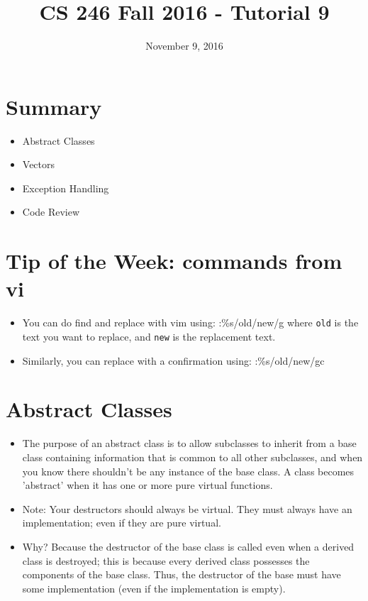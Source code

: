\documentclass{article}
\title{CS 246 Fall 2016 - Tutorial 9}
\author{}
\date{November 9, 2016}
\begin{document}
\maketitle

\section{Summary}
\begin{itemize}
\item Abstract Classes
\item Vectors
\item Exception Handling
\item Code Review
\end{itemize}

\section{Tip of the Week: commands from vi}

\begin{itemize}
    \item You can do find and replace with vim using: :\%s/old/new/g where \texttt{old} is the text you want to replace, and \texttt{new} is the replacement text.

    \item Similarly, you can replace with a confirmation using: :\%s/old/new/gc
\end{itemize}


\section{Abstract Classes}

\begin{itemize}

\item The purpose of an abstract class is to allow subclasses to inherit from a base class containing information that is common to all other subclasses, and when you know there shouldn't be any instance of the base class. A class becomes 'abstract' when it has one or more pure virtual functions.

\item Note: Your destructors should always be virtual. They must always have an implementation; even if they are pure virtual.

\item Why? Because the destructor of the base class is called even when a derived class is destroyed; this is because every derived class possesses the components of the base class. Thus, the destructor of the base must have some implementation (even if the implementation is empty).

\end{itemize}
\end{document}
